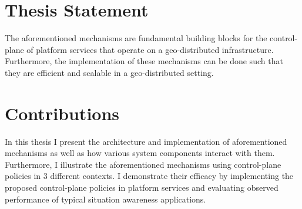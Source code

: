 \section{Thesis Statement}
The aforementioned mechanisms are fundamental building blocks for the control-plane of platform services that operate on a geo-distributed infrastructure. Furthermore, the implementation of these mechanisms can be done such that they are efficient and scalable in a geo-distributed setting.
\section{Contributions}
In this thesis I present the architecture and implementation of aforementioned mechanisms as well as how various system components interact with them. Furthermore, I illustrate the aforementioned mechanisms using control-plane policies in 3 different contexts. I demonstrate their efficacy by implementing the proposed control-plane policies in platform services and evaluating observed performance of typical situation awareness applications.

